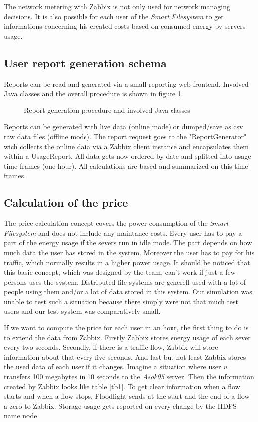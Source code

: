 The network metering with Zabbix is not only used for network managing decisions. It is also possible for each user of the \textit{Smart Filesystem} to get informations concerning his created costs based on consumed energy by servers usage.

\subsection{User report generation schema}
  Reports can be read and generated via a small reporting web frontend. Involved Java classes and the overall procedure is shown in figure \ref{akt}.

 \begin{figure}
 \centering
 
 \caption{Report generation procedure and involved Java classes}
 \label{akt}
 \end{figure}

 Reports can be generated with live data (online mode) or dumped/save as csv raw data files (offline mode). The report request goes to the "ReportGenerator" wich collects the online data via a Zabbix client instance and encapsulates them within a UsageReport. All data gets now ordered by date and splitted into usage time frames (one hour). All calculations are based and summarized on this time frames.
 
 \subsection{Calculation of the price} 
 The price calculation concept covers the power consumption of the \textit{Smart Filesystem} and does not include any maintance costs.
 Every user has to pay a part of the energy usage if the severs run in idle mode. The part depends on how much data the user has stored in the system. Moreover the user has to pay for his traffic, which normally results in a higher power usage. It should be noticed that this basic concept, which was designed by the team, can't work if just a few persons uses the system. Distributed file systems are generell used with a lot of people using them and/or a lot of data stored in this system. Out simulation was unable to test such a situation because there simply were not that much test users and our test system was comparatively small. 
 
 If we want to compute the price for each user in an hour, the first thing to do is to extend the data from Zabbix. Firstly Zabbix stores energy usage of each sever every two seconds. Secondly, if there is a traffic flow, Zabbix will store information about that every five seconds. And last but not least Zabbix stores the used data of each user if it changes. Imagine a situation where user \textit{u} transfers 100 megabytes in 10 seconds to the \textit{Asok05} server. Then the information created by Zabbix looks like table \ref{tb1}. 
 To get clear information when a flow starts and when a flow stops, Floodlight sends at the start and the end of a flow a zero to Zabbix. Storage usage gets reported on every change by the HDFS name node.

